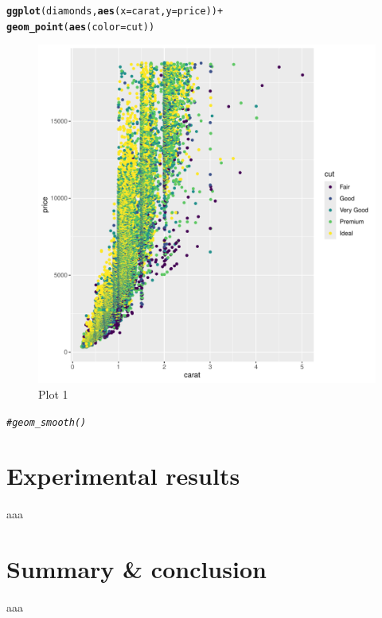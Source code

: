 \documentclass[12pt]{report}\usepackage[]{graphicx}\usepackage[]{xcolor}
\makeatletter
\newcommand{\hlcom}[1]{\textcolor[rgb]{0.678,0.584,0.686}{\textit{#1}}}%
\newcommand{\hlopt}[1]{\textcolor[rgb]{0,0,0}{#1}}%
\newcommand{\hlstd}[1]{\textcolor[rgb]{0.345,0.345,0.345}{#1}}%
\newcommand{\hlkwc}[1]{\textcolor[rgb]{0.333,0.667,0.333}{#1}}%
\newcommand{\hlkwd}[1]{\textcolor[rgb]{0.737,0.353,0.396}{\textbf{#1}}}%
\newenvironment{kframe}{%
 \def\at@end@of@kframe{}%
 \ifinner\ifhmode%
  \def\at@end@of@kframe{\end{minipage}}%
  \begin{minipage}{\columnwidth}%
 \fi\fi%
 \def\FrameCommand##1{\hskip\@totalleftmargin \hskip-\fboxsep
 \colorbox{shadecolor}{##1}\hskip-\fboxsep
     \hskip-\linewidth \hskip-\@totalleftmargin \hskip\columnwidth}%
 \MakeFramed {\advance\hsize-\width
   \@totalleftmargin\z@ \linewidth\hsize
   \@setminipage}}%
 {\par\unskip\endMakeFramed%
 \at@end@of@kframe}
\newenvironment{knitrout}{}{} %
\makeatother
\begin{document}
\begin{knitrout}
\color{fgcolor}\begin{kframe}
\begin{alltt}
\hlkwd{ggplot}\hlstd{(diamonds,} \hlkwd{aes}\hlstd{(}\hlkwc{x} \hlstd{= carat,} \hlkwc{y} \hlstd{= price))} \hlopt{+}
\hlkwd{geom_point}\hlstd{(}\hlkwd{aes}\hlstd{(}\hlkwc{color} \hlstd{= cut))}
\end{alltt}
\end{kframe}\begin{figure}[H]

{\centering \includegraphics[width=0.75\linewidth]{figure/unnamed-chunk-2-1} 

}

\caption{\label{fig:fig2}Plot 1}\label{fig:unnamed-chunk-2}
\end{figure}

\begin{kframe}\begin{alltt}
\hlcom{#geom_smooth()}
\end{alltt}
\end{kframe}
\end{knitrout}

    \chapter*{Experimental results}\label{ch:sec2}

    aaa

    \chapter*{Summary \& conclusion}\label{ch:sec3}

    aaa
\end{document}
